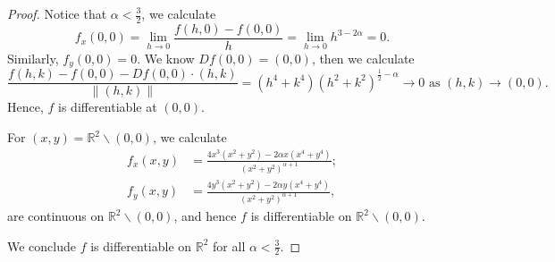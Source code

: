 \begin{Exercise}
\begin{proof}
Notice that $\alpha<\frac{3}{2}$, we calculate
$$
f_x(0,0) 
= \lim_{h\to 0} \frac{f(h,0)-f(0,0)}{h} 
= \lim_{h\to 0} h^{3-2\alpha}
= 0.
$$
Similarly, $f_y(0,0) = 0$. We know $D f(0,0) = (0,0)$, then we calculate
$$
\frac{f(h,k)-f(0,0)-D f(0,0)\cdot(h,k)}{\| (h,k) \|}
= \left( h^4+k^4 \right) \left(h^2+k^2 \right)^{\frac{1}{2}-\alpha} \to 0 \text{ as } (h,k)\to(0,0).
$$
Hence, $f$ is differentiable at $(0,0)$.

For $(x,y) = \mathbb{R}^2 \backslash (0,0)$, we calculate
\begin{align*}
f_x(x,y) &= \frac{4x^3(x^2+y^2)-2\alpha x(x^4+y^4)}{(x^2+y^2)^{\alpha+1}}; \\
f_y(x,y) &= \frac{4y^3(x^2+y^2)-2\alpha y(x^4+y^4)}{(x^2+y^2)^{\alpha+1}},
\end{align*}
are continuous on $\mathbb{R}^2 \backslash (0,0)$, and hence $f$ is differentiable on $\mathbb{R}^2 \backslash (0,0)$.

We conclude $f$ is differentiable on $\mathbb{R}^2$ for all $\alpha<\frac{3}{2}$.
\end{proof}
\end{Exercise}